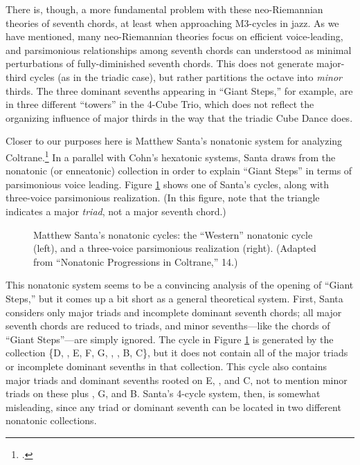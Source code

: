 There is, though, a more fundamental problem with these neo-Riemannian theories
of seventh chords, at least when approaching M3-cycles in jazz. As we have
mentioned, many neo-Riemannian theories focus on
efficient voice-leading, and parsimonious relationships among seventh chords
can understood as minimal perturbations of fully-diminished seventh
chords. This does not generate major-third cycles (as in the
triadic case), but rather partitions the octave into \emph{minor} thirds. The
three dominant sevenths appearing in ``Giant Steps,'' for example, are in
three different ``towers'' in the 4-Cube Trio, which does not reflect
the organizing influence of major thirds in the way that the triadic Cube
Dance does.

Closer to our purposes here is Matthew Santa's nonatonic system for analyzing
Coltrane.\footcite{santa:2003} In a parallel with Cohn's hexatonic systems,
Santa draws from the nonatonic (or enneatonic) collection in order to explain
``Giant Steps'' in terms of parsimonious voice leading. Figure
\ref{maj3:nonatonic-cycle} shows one of Santa's cycles, along with three-voice
parsimonious realization. (In this figure, note that the triangle indicates a
major \emph{triad}, not a major seventh chord.)
%
\begin{figure}[tbp]
  \caption[Matthew Santa's nonatonic cycles.]{Matthew Santa's nonatonic
    cycles: the ``Western'' nonatonic cycle (left), and a three-voice parsimonious
    realization (right). (Adapted from ``Nonatonic Progressions in Coltrane,''
    14.)}
\label{maj3:nonatonic-cycle}
\end{figure}
%
This nonatonic system seems to be a convincing analysis of the opening of
``Giant Steps,'' but it comes up a bit short as a general theoretical
system. First, Santa considers only major triads and incomplete dominant
seventh chords; all major seventh chords are reduced to triads, and minor
sevenths---like the \ii chords of ``Giant Steps''---are simply
ignored. The cycle in Figure \ref{maj3:nonatonic-cycle} is
generated by the collection \{D, \Eflat, E, F\sharp, G, \Aflat, \Bflat, B,
C\}, but it does not contain all of the major triads or incomplete dominant
sevenths in that collection. This cycle also contains major triads and dominant
sevenths rooted on E, \Aflat, and C, not to mention minor triads on these
plus \Eflat, G, and B. Santa's 4-cycle system, then, is somewhat misleading,
since any triad or dominant seventh can be located in two different nonatonic
collections.

